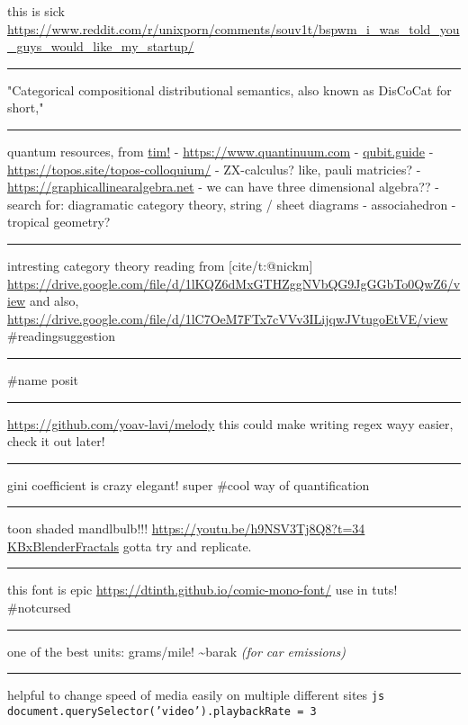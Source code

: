 \documentclass[letterpaper]{article}
\begin{document}
this is sick
\url{https://www.reddit.com/r/unixporn/comments/souv1t/bspwm\_i\_was\_told\_you\_guys\_would\_like\_my\_startup/}

\noindent\rule{\textwidth}{0.5pt}

"Categorical compositional distributional semantics, also known as
DisCoCat for short,"

\noindent\rule{\textwidth}{0.5pt}

quantum resources, from \href{https://thosgood.com}{tim!} -
\url{https://www.quantinuum.com} - \href{https://qubit.guide}{qubit.guide} -
\url{https://topos.site/topos-colloquium/} - ZX-calculus? like, pauli
matricies? - \url{https://graphicallinearalgebra.net} - we can have three
dimensional algebra?? - search for: diagramatic category theory, string
/ sheet diagrams - associahedron - tropical geometry?

\noindent\rule{\textwidth}{0.5pt}

intresting category theory reading from [cite/t:@nickm]
\url{https://drive.google.com/file/d/1lKQZ6dMxGTHZggNVbQG9JgGGbTo0QwZ6/view}
and also,
\url{https://drive.google.com/file/d/1lC7OeM7FTx7cVVv3ILijqwJVtugoEtVE/view}
\#readingsuggestion

\noindent\rule{\textwidth}{0.5pt}

\#name posit

\noindent\rule{\textwidth}{0.5pt}

\url{https://github.com/yoav-lavi/melody} this could make writing regex wayy
easier, check it out later!

\noindent\rule{\textwidth}{0.5pt}

gini coefficient is crazy elegant! super \#cool way of quantification

\noindent\rule{\textwidth}{0.5pt}

toon shaded mandlbulb!!! \url{https://youtu.be/h9NSV3Tj8Q8?t=34}
\href{KBxBlenderFractals.org}{KBxBlenderFractals} gotta try and
replicate.

\noindent\rule{\textwidth}{0.5pt}

this font is epic \url{https://dtinth.github.io/comic-mono-font/} use in tuts!
\#notcursed

\noindent\rule{\textwidth}{0.5pt}

one of the best units: grams/mile! \textasciitilde{}barak \emph{(for car emissions)}

\noindent\rule{\textwidth}{0.5pt}

helpful to change speed of media easily on multiple different sites
\texttt{js document.querySelector('video').playbackRate = 3}
\end{document}

